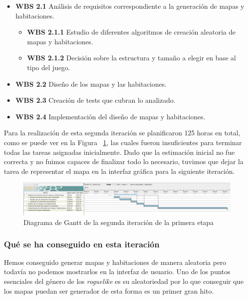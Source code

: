 \begin{itemize}
  \item \textbf{WBS 2.1} Análisis de requisitos correspondiente a la generación de mapas y habitaciones.
    \begin{itemize}
      \item \textbf{WBS 2.1.1} Estudio de diferentes algoritmos de creación aleatoria de mapas y habitaciones.
      \item \textbf{WBS 2.1.2} Decisión sobre la estructura y tamaño a elegir en base al tipo del juego.
    \end{itemize}
  \item \textbf{WBS 2.2} Diseño de los mapas y las habitaciones.
  \item \textbf{WBS 2.3} Creación de tests que cubran lo analizado.
  \item \textbf{WBS 2.4} Implementación del diseño de mapas y habitaciones.
\end{itemize}

\noindent Para la realización de esta segunda iteración se planificaron 125 horas en total, como se puede ver en la Figura ~\ref{fig:sec1it2}, las cuales fueron insuficientes para terminar todas las tareas asignadas inicialmente. Dado que la estimación inicial no fue correcta y no fuimos capaces de finalizar todo lo necesario, tuvimos que dejar la tarea de representar el mapa en la interfaz gráfica para la siguiente iteración.

\begin{figure}
    \includegraphics[width=\textwidth,height=\textheight,keepaspectratio]{./img/sec1it2.png}
  \caption{Diagrama de Gantt de la segunda iteración de la primera etapa}
  \label{fig:sec1it2}
\end{figure}

\subsubsection{Qué se ha conseguido en esta iteración}

Hemos conseguido generar mapas y habitaciones de manera aleatoria pero todavía no podemos mostrarlos en la interfaz de usuario. Uno de los puntos esenciales del género de los \textit{roguelike} es su aleatoriedad por lo que conseguir que los mapas puedan ser generador de esta forma es un primer gran hito.

